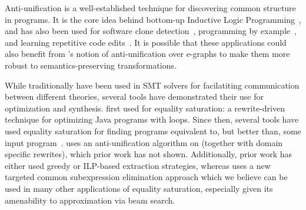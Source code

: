 %
Anti-unification is a well-established technique for discovering common structure in programs.
%
It is the core idea behind bottom-up Inductive Logic Programming~\cite{ilp},
and has also been used for software clone detection~\cite{Bulychev10},
programming by example~\cite{raza2014programming},
and learning repetitive code edits~\cite{lase,refaser}.
%
It is possible that these applications could also benefit from \tool's notion of anti-unification over e-graphs
to make them more robust to semantics-preserving transformations.

While traditionally \egraphs have been used
  in SMT solvers for
  facilatiting communication between
  different theories,
  several tools have demonstrated
  their use for optimization
  and synthesis.
\citet{tate2009equality} first used \egraphs for
  equality saturation: a rewrite-driven technique
  for optimizing Java programs with loops.
Since then, several tools have used equality saturation
  for finding programs equivalent to,
  but better than, some
  input program~\cite{willsey2021egg, herbie, tensat, szalinski, diospyros, spores,
  cc1}.
\tool uses an anti-unification
  algorithm on \egraphs
  (together with domain specific
  rewrites), which prior work has not shown.
Additionally, prior work has either used
  greedy or ILP-based extraction strategies,
  whereas \tool uses a new targeted common
  subexpression elimination approach which
  we believe can be used in many other applications of
  equality saturation, especially given its
  amenability to approximation via beam search.


